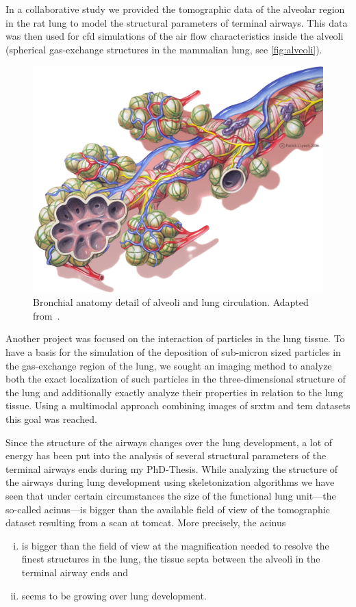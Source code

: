 In a collaborative study we provided the tomographic data of the alveolar region in the rat lung to model the structural parameters of terminal airways. This data was then used for \ac{cfd} simulations of the air flow characteristics inside the alveoli (spherical gas-exchange structures in the mammalian lung, see \autoref{fig:alveoli}).

\renewcommand{\imsize}{\linewidth}
\begin{figure}
	\centering%
	\includegraphics[width=\imsize]{img/Bronchial_anatomy_edit}%
	\caption[Bronchial anatomy detail]{Bronchial anatomy detail of alveoli and lung circulation. Adapted from~\cite{Alveoli}.}%
	\label{fig:alveoli}%
\end{figure}

Another project was focused on the interaction of particles in the lung tissue. To have a basis for the simulation of the deposition of sub-micron sized particles in the gas-exchange region of the lung, we sought an imaging method to analyze both the exact localization of such particles in the three-dimensional structure of the lung and additionally exactly analyze their properties in relation to the lung tissue. Using a multimodal approach combining images of \ac{srxtm} and \ac{tem} datasets this goal was reached.

Since the structure of the airways changes over the lung development, a lot of energy has been put into the analysis of several structural parameters of the terminal airways ends during my PhD-Thesis. While analyzing the structure of the airways during lung development using skeletonization algorithms we have seen that under certain circumstances the size of the functional lung unit---the so-called acinus---is bigger than the available field of view of the tomographic dataset resulting from a scan at \ac{tomcat}. More precisely, the acinus 
\begin{enumerate}[i)]
	\item is bigger than the field of view at the magnification needed to resolve the finest structures in the lung, the tissue septa between the alveoli in the terminal airway ends and
	\item seems to be growing over lung development.
\end{enumerate}

